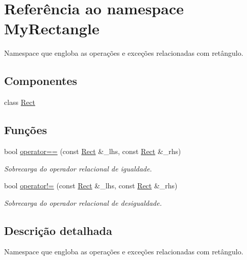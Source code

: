 \hypertarget{namespaceMyRectangle}{}\section{Referência ao namespace My\+Rectangle}
\label{namespaceMyRectangle}


Namespace que engloba as opera\c{c}\~{o}es e exce\c{c}\~{o}es relacionadas com ret\^{a}ngulo.  


\subsection*{Componentes}
\begin{DoxyCompactItemize}
\item 
class \hyperlink{classMyRectangle_1_1Rect}{Rect}
\end{DoxyCompactItemize}
\subsection*{Funções}
\begin{DoxyCompactItemize}
\item 
bool \hyperlink{namespaceMyRectangle_ac7f0fc166f15fb9c52ae605e6b0fa966}{operator==} (const \hyperlink{classMyRectangle_1_1Rect}{Rect} \&\+\_\+lhs, const \hyperlink{classMyRectangle_1_1Rect}{Rect} \&\+\_\+rhs)
\begin{DoxyCompactList}\small\item\em Sobrecarga do operador relacional de igualdade. \end{DoxyCompactList}\item 
bool \hyperlink{namespaceMyRectangle_ae3a67d27c82714709278ee7a34f7a040}{operator!=} (const \hyperlink{classMyRectangle_1_1Rect}{Rect} \&\+\_\+lhs, const \hyperlink{classMyRectangle_1_1Rect}{Rect} \&\+\_\+rhs)
\begin{DoxyCompactList}\small\item\em Sobrecarga do operador relacional de desigualdade. \end{DoxyCompactList}\end{DoxyCompactItemize}


\subsection{Descrição detalhada}
Namespace que engloba as opera\c{c}\~{o}es e exce\c{c}\~{o}es relacionadas com ret\^{a}ngulo. 


